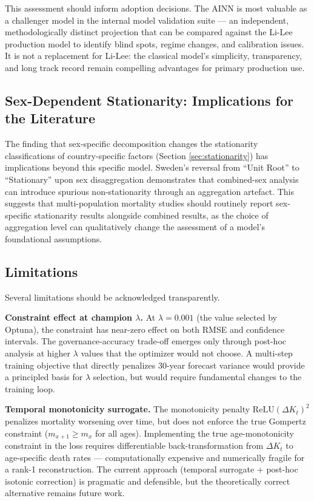 \documentclass[11pt,a4paper]{article}
\begin{document}
This assessment should inform adoption decisions. The AINN is most valuable as a challenger model in the internal model validation suite --- an independent, methodologically distinct projection that can be compared against the Li-Lee production model to identify blind spots, regime changes, and calibration issues. It is not a replacement for Li-Lee: the classical model's simplicity, transparency, and long track record remain compelling advantages for primary production use.

\subsection{Sex-Dependent Stationarity: Implications for the Literature}

The finding that sex-specific decomposition changes the stationarity classifications of country-specific factors (Section \ref{sec:stationarity}) has implications beyond this specific model. Sweden's reversal from ``Unit Root'' to ``Stationary'' upon sex disaggregation demonstrates that combined-sex analysis can introduce spurious non-stationarity through an aggregation artefact. This suggests that multi-population mortality studies should routinely report sex-specific stationarity results alongside combined results, as the choice of aggregation level can qualitatively change the assessment of a model's foundational assumptions.

\subsection{Limitations}

Several limitations should be acknowledged transparently.

\textbf{Constraint effect at champion $\lambda$.} At $\lambda = 0.001$ (the value selected by Optuna), the constraint has near-zero effect on both RMSE and confidence intervals. The governance-accuracy trade-off emerges only through post-hoc analysis at higher $\lambda$ values that the optimizer would not choose. A multi-step training objective that directly penalizes 30-year forecast variance would provide a principled basis for $\lambda$ selection, but would require fundamental changes to the training loop.

\textbf{Temporal monotonicity surrogate.} The monotonicity penalty $\text{ReLU}(\Delta K_t)^2$ penalizes mortality worsening over time, but does not enforce the true Gompertz constraint ($m_{x+1} \geq m_x$ for all ages). Implementing the true age-monotonicity constraint in the loss requires differentiable back-transformation from $\Delta K_t$ to age-specific death rates --- computationally expensive and numerically fragile for a rank-1 reconstruction. The current approach (temporal surrogate + post-hoc isotonic correction) is pragmatic and defensible, but the theoretically correct alternative remains future work.
\end{document}
